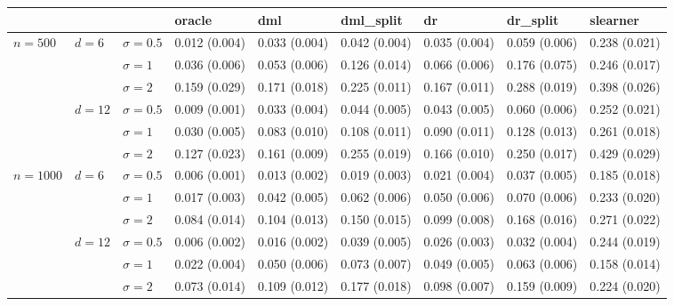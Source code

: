 \documentclass[11pt]{article} %
\theoremstyle{theorem}  %
\theoremstyle{plain}
\begin{document}
\begin{figure}[H]
\scriptsize
\centering
\begin{tabular}{lllllllll}
\toprule
         &        &            &         oracle &            dml &     dml\_split &             dr &      dr\_split &       slearner \\
\midrule
\multirow{6}{*}{$n=500$} & \multirow{3}{*}{$d=6$} & $\sigma=0.5$ &  0.012 (0.004) &  0.033 (0.004) &  0.042 (0.004) &  0.035 (0.004) &  0.059 (0.006) &  0.238 (0.021) \\
         &        & $\sigma=1$ &  0.036 (0.006) &  0.053 (0.006) &  0.126 (0.014) &  0.066 (0.006) &  0.176 (0.075) &  0.246 (0.017) \\
         &        & $\sigma=2$ &  0.159 (0.029) &  0.171 (0.018) &  0.225 (0.011) &  0.167 (0.011) &  0.288 (0.019) &  0.398 (0.026) \\
\cline{2-9}
         & \multirow{3}{*}{$d=12$} & $\sigma=0.5$ &  0.009 (0.001) &  0.033 (0.004) &  0.044 (0.005) &  0.043 (0.005) &  0.060 (0.006) &  0.252 (0.021) \\
         &        & $\sigma=1$ &  0.030 (0.005) &  0.083 (0.010) &  0.108 (0.011) &  0.090 (0.011) &  0.128 (0.013) &  0.261 (0.018) \\
         &        & $\sigma=2$ &  0.127 (0.023) &  0.161 (0.009) &  0.255 (0.019) &  0.166 (0.010) &  0.250 (0.017) &  0.429 (0.029) \\
\cline{1-9}
\cline{2-9}
\multirow{6}{*}{$n=1000$} & \multirow{3}{*}{$d=6$} & $\sigma=0.5$ &  0.006 (0.001) &  0.013 (0.002) &  0.019 (0.003) &  0.021 (0.004) &  0.037 (0.005) &  0.185 (0.018) \\
         &        & $\sigma=1$ &  0.017 (0.003) &  0.042 (0.005) &  0.062 (0.006) &  0.050 (0.006) &  0.070 (0.006) &  0.233 (0.020) \\
         &        & $\sigma=2$ &  0.084 (0.014) &  0.104 (0.013) &  0.150 (0.015) &  0.099 (0.008) &  0.168 (0.016) &  0.271 (0.022) \\
\cline{2-9}
         & \multirow{3}{*}{$d=12$} & $\sigma=0.5$ &  0.006 (0.002) &  0.016 (0.002) &  0.039 (0.005) &  0.026 (0.003) &  0.032 (0.004) &  0.244 (0.019) \\
         &        & $\sigma=1$ &  0.022 (0.004) &  0.050 (0.006) &  0.073 (0.007) &  0.049 (0.005) &  0.063 (0.006) &  0.158 (0.014) \\
         &        & $\sigma=2$ &  0.073 (0.014) &  0.109 (0.012) &  0.177 (0.018) &  0.098 (0.007) &  0.159 (0.009) &  0.224 (0.020) \\

\end{tabular}
\end{figure}
\end{document}

